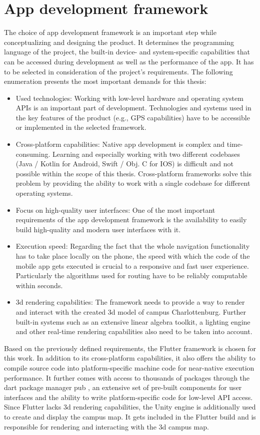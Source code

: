 \section{App development framework}
The choice of app development framework is an important step while conceptualizing and designing the product. It determines the programming language of the project, the built-in device- and system-specific capabilities that can be accessed during development as well as the performance of the app. It has to be selected in consideration of the project's requirements. The following enumeration presents the most important demands for this thesis:
\begin{itemize}
    \item Used technologies: Working with low-level hardware and operating system APIs is an important part of development. Technologies and systems used in the key features of the product (e.g., GPS capabilities) have to be accessible or implemented in the selected framework.
    \item Cross-platform capabilities: Native app development is complex and time-consuming. Learning and especially working with two different codebases (Java / Kotlin for Android, Swift / Obj. C for IOS) is difficult and not possible within the scope of this thesis. Cross-platform frameworks solve this problem by providing the ability to work with a single codebase for different operating systems.
    \item Focus on high-quality user interfaces: One of the most important requirements of the app development framework is the availability to easily build high-quality and modern user interfaces with it. 
    \item Execution speed: Regarding the fact that the whole navigation functionality has to take place locally on the phone, the speed with which the code of the mobile app gets executed is crucial to a responsive and fast user experience. Particularly the algorithms used for routing have to be reliably computable within seconds.
    \item 3d rendering capabilities: The framework needs to provide a way to render and interact with the created 3d model of campus Charlottenburg. Further built-in systems such as an extensive linear algebra toolkit, a lighting engine and other real-time rendering capabilities also need to be taken into account.
\end{itemize}

Based on the previously defined requirements, the Flutter framework \cite{flutter} is chosen for this work. In addition to its cross-platform capabilities, it also offers the ability to compile source code into platform-specific machine code for near-native execution performance. It further comes with access to thousands of packages through the dart package manager pub \cite{pub_dev}, an extensive set of pre-built components for user interfaces and the ability to write platform-specific code for low-level API access. Since Flutter lacks 3d rendering capabilities, the Unity engine \cite{unity_engine} is additionally used to create and display the campus map. It gets included in the Flutter build and is responsible for rendering and interacting with the 3d campus map.

